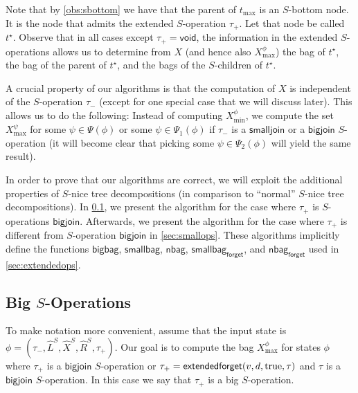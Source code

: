 \documentclass[a4paper,UKenglish,cleveref, autoref, thm-restate, numberwithinsect]{lipics-v2021}
\newcounter{algorithm}
\newcommand{\bigjoin}{\mathsf{bigjoin}}
\newcommand{\smalljoin}{\mathsf{smalljoin}}
\newcommand{\extendedforget}{\mathsf{extendedforget}}
\newcommand{\void}{\mathsf{void}}
\newcommand{\bigbag}{\mathsf{bigbag}}
\newcommand{\nbag}{\mathsf{nbag}}
\newcommand{\smallbag}{\mathsf{smallbag}}
\newcommand{\nbagf}{\mathsf{nbag}_{\mathsf{forget}}}
\newcommand{\smallbagf}{\mathsf{smallbag}_{\mathsf{forget}}}
\newcommand{\true}{\textup{true}}
\newcommand{\slim}{\text{slim}\xspace}
\newcommand{\topheavy}{\text{top-heavy}\xspace}
\begin{document}
Note that by \cref{obs:sbottom} we have that the parent of $t_{\max}$ is an $S$-bottom node. It is the node that admits the extended $S$-operation $\tau_+$. Let that node be called $t^\star$.
Observe that in all cases except $\tau_+=\void$, the information in the extended $S$-operations allows us to determine from $X$ (and hence also $X^\phi_{\max}$) the bag of $t^\star$, the bag of the parent of $t^\star$, and the bags of the $S$-children of $t^\star$. 

A crucial property of our algorithms is that the computation of $X$ is independent of the $S$-operation $\tau_-$ (except for one special case that we will discuss later). 
This allows us to do the following: Instead of computing $X^\phi_{\min}$, we compute the set $X^\psi_{\max}$ for some $\psi\in\Psi(\phi)$ or some $\psi\in\Psi_1(\phi)$ if $\tau_-$ is a $\smalljoin$ or a $\bigjoin$ $S$-operation (it will become clear that picking some $\psi\in\Psi_2(\phi)$ will yield the same result).

In order to prove that our algorithms are correct, we will exploit the additional properties of \slim \topheavy $S$-nice tree decompositions (in comparison to ``normal'' $S$-nice tree decompositions). 
In \cref{sec:bigops}, we present the algorithm for the case where $\tau_+$ is $S$-operations $\bigjoin$.
Afterwards, we present the algorithm for the case where $\tau_+$ is different from $S$-operation $\bigjoin$ in \cref{sec:smallops}. These algorithms implicitly define the functions $\bigbag$, $\smallbag$, $\nbag$, $\smallbagf$, and $\nbagf$ used in \cref{sec:extendedops}.



\subsection{Big \boldmath$S$-Operations}\label{sec:bigops}
To make notation more convenient, assume that the input state is $\phi=(\tau_-,\hat{L}^S, \hat{X}^S, \hat{R}^S,\tau_+)$. 
Our goal is to compute the bag $X^\phi_{\max}$  for states $\phi$ where $\tau_+$ is a $\bigjoin$ $S$-operation or $\tau_+=\extendedforget(v,d,\true,\tau)$ and $\tau$ is a $\bigjoin$ $S$-operation. In this case we say that $\tau_+$ is a big $S$-operation. 
\end{document}
